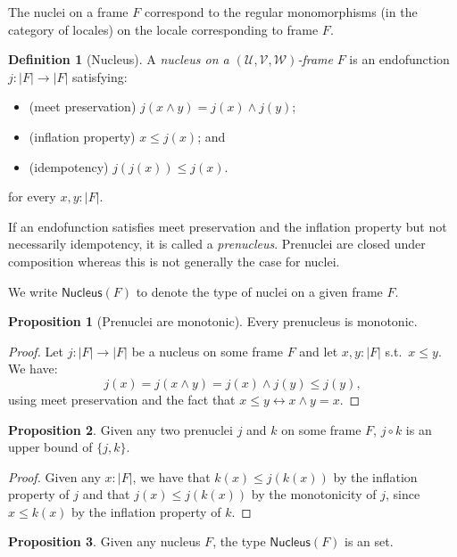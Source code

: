 \documentclass[a4paper, 11pt]{article}
\theoremstyle{definition}
\newtheorem{prop}{Proposition}
\newtheorem{defn}{Definition}
\newcommand{\UU}{\mathcal{U}}
\newcommand{\VV}{\mathcal{V}}
\newcommand{\WW}{\mathcal{W}}
\newcommand{\define}[1]{\emph{#1}}
\begin{document}
The nuclei on a frame $F$ correspond to the regular monomorphisms (in the category of locales) on
the locale corresponding to frame $F$.

\begin{defn}[Nucleus]
  A \define{nucleus on a $(\UU, \VV, \WW)$-frame} $F$ is an endofunction $j : | F | \rightarrow | F |$
  satisfying:
  \begin{itemize}
    \item (meet preservation) $j(x \wedge y) = j(x) \wedge j(y)$;
    \item (inflation property) $x \le j(x)$; and
    \item (idempotency) $j(j(x)) \le j(x)$.
  \end{itemize}
  for every $x, y : | F |$.
\end{defn}

If an endofunction satisfies meet preservation and the inflation property but not necessarily
idempotency, it is called a \define{prenucleus}. Prenuclei are closed under composition whereas this
is not generally the case for nuclei.

We write $\mathsf{Nucleus}(F)$ to denote the type of nuclei on a given frame $F$.

\begin{prop}[Prenuclei are monotonic]\label{prop:nuclei-mono}
  Every prenucleus is monotonic.
\end{prop}
\begin{proof}
  Let $j : | F | \rightarrow | F |$ be a nucleus on some frame $F$ and let $x, y : | F |$
  s.t.\ $x \le y$.
  We have:
  \begin{equation*}
    j(x) = j (x \wedge y) = j(x) \wedge j(y) \le j(y),
  \end{equation*}
  using meet preservation and the fact that $x \le y \leftrightarrow x \wedge y = x$.
\end{proof}

\begin{prop}\label{prop:nucl-lemma-1}
  Given any two prenuclei $j$ and $k$ on some frame $F$, $j \circ k$ is an upper bound of $\{ j, k \}$.
\end{prop}
\begin{proof}
  Given any $x : | F |$, we have that $k(x) \le j(k(x))$ by the inflation property of $j$ and that
  $j(x) \le j(k(x))$ by the monotonicity of $j$, since $x \le k(x)$ by the inflation property of $k$.
\end{proof}

\begin{prop}
  Given any nucleus $F$, the type $\mathsf{Nucleus}(F)$ is an set.
\end{prop}
\end{document}
